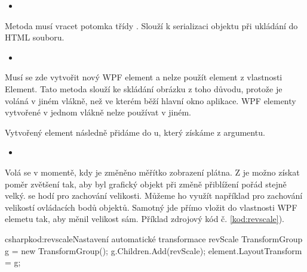 \documentclass[
  field=inf,
  biblatex=false,
  glossaries,
  index
]{kidiplom}
\begin{document}
\begin{itemize}
\item {}
\end{itemize}
Metoda musí vracet potomka třídy . Slouží k serializaci objektu při ukládání do HTML souboru.

\begin{itemize}
\item {}
\end{itemize}
Musí se zde vytvořit nový WPF element a nelze použít element z vlastnosti Element. Tato metoda slouží ke skládání obrázku z toho důvodu, protože je voláná v jiném vlákně, než ve kterém běží hlavní okno aplikace. WPF elementy vytvořené v jednom vlákně nelze používat v jiném.

Vytvořený element následně přidáme do u, který získáme z argumentu.

\begin{itemize}
\item {}
\end{itemize}

Volá se v momentě, kdy je změněno měřítko zobrazení plátna. Z  je možno získat poměr zvětšení tak, aby byl grafický objekt při změně přiblížení pořád stejně velký.  se hodí pro zachování velikosti. Můžeme ho využít například pro zachování velikostí ovládacích bodů objektů. Samotný  jde přímo vložit do vlastnosti WPF elemetu tak, aby měnil velikost sám. Příklad zdrojový kód č. \ref{kod:revscale}).

\begin{kicode}{csharp}{kod:revscale}{Nastavení automatické transformace revScale}
TransformGroup g = new TransformGroup();
g.Children.Add(revScale);
element.LayoutTransform = g;
\end{kicode}
\end{document}
